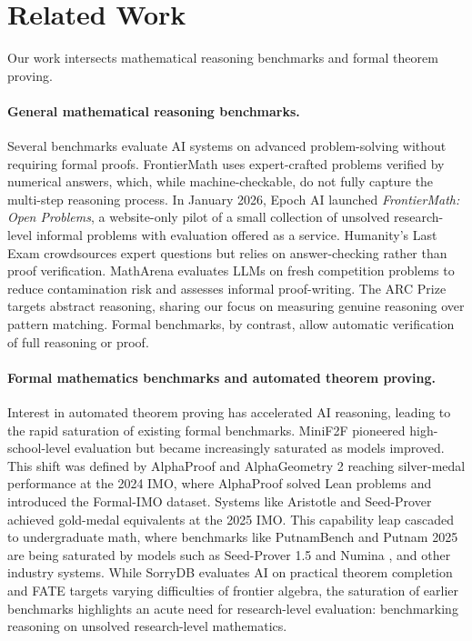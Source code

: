 \section{Related Work}\label{sec:related_work}

Our work intersects mathematical reasoning benchmarks and formal theorem proving.

\paragraph{General mathematical reasoning benchmarks.}
Several benchmarks evaluate AI systems on advanced problem-solving without requiring formal proofs.
FrontierMath \citep{frontiermath24} uses expert-crafted problems verified by numerical answers, which, while machine-checkable, do not fully capture the multi-step reasoning process.
In January 2026, Epoch AI launched \emph{FrontierMath: Open Problems}, a website-only pilot of a small collection of unsolved research-level informal problems with evaluation offered as a service.
Humanity's Last Exam \citep{humanitysexam25} crowdsources expert questions but relies on answer-checking rather than proof verification.
MathArena \citep{matharena25} evaluates LLMs on fresh competition problems to reduce contamination risk and assesses informal proof-writing.
The ARC Prize \citep{ARC24, ARC25} targets abstract reasoning, sharing our focus on measuring genuine reasoning over pattern matching.
Formal benchmarks, by contrast, allow automatic verification of full reasoning or proof.

\paragraph{Formal mathematics benchmarks and automated theorem proving.}
Interest in automated theorem proving has accelerated AI reasoning, leading to the rapid saturation of existing formal benchmarks.
MiniF2F \citep{minif2f21} pioneered high-school-level evaluation but became increasingly saturated as models improved.
This shift was defined by AlphaProof \citep{AlphaProof25} and AlphaGeometry 2 \citep{chervonyi2025gold} reaching silver-medal performance at the 2024 IMO, where AlphaProof solved Lean problems and introduced the Formal-IMO \citep{AlphaProof25} dataset.
Systems like Aristotle \citep{achim2025aristotle} and Seed-Prover \citep{chen2025seed} achieved gold-medal equivalents at the 2025 IMO.
This capability leap cascaded to undergraduate math, where benchmarks like PutnamBench \citep{putnambench24} and Putnam 2025 are being saturated by models such as Seed-Prover 1.5 \citep{chen2025seed15} and Numina \citep{liu2026numina}, and other industry systems.
While SorryDB \citep{sorrydb26} evaluates AI on practical theorem completion and FATE \citep{jiang2025fate} targets varying difficulties of frontier algebra, the saturation of earlier benchmarks highlights an acute need for research-level evaluation: benchmarking reasoning on unsolved research-level mathematics.


